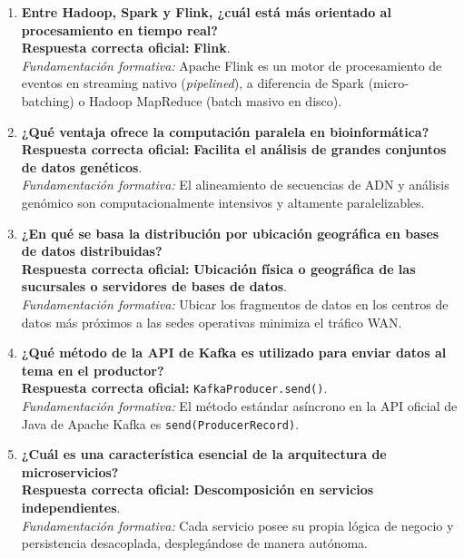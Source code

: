 \documentclass[11pt,a4paper]{article}
\begin{document}
\begin{enumerate}[label=\textbf{Pregunta \arabic*.}]
    \item \textbf{Entre Hadoop, Spark y Flink, ¿cuál está más orientado al procesamiento en tiempo real?}\\
    \textbf{Respuesta correcta oficial:} \textbf{Flink}.\\
    \textit{Fundamentación formativa:} Apache Flink es un motor de procesamiento de eventos en streaming nativo (\textit{pipelined}), a diferencia de Spark (micro-batching) o Hadoop MapReduce (batch masivo en disco).

    \item \textbf{¿Qué ventaja ofrece la computación paralela en bioinformática?}\\
    \textbf{Respuesta correcta oficial:} \textbf{Facilita el análisis de grandes conjuntos de datos genéticos}.\\
    \textit{Fundamentación formativa:} El alineamiento de secuencias de ADN y análisis genómico son computacionalmente intensivos y altamente paralelizables.

    \item \textbf{¿En qué se basa la distribución por ubicación geográfica en bases de datos distribuidas?}\\
    \textbf{Respuesta correcta oficial:} \textbf{Ubicación física o geográfica de las sucursales o servidores de bases de datos}.\\
    \textit{Fundamentación formativa:} Ubicar los fragmentos de datos en los centros de datos más próximos a las sedes operativas minimiza el tráfico WAN.

    \item \textbf{¿Qué método de la API de Kafka es utilizado para enviar datos al tema en el productor?}\\
    \textbf{Respuesta correcta oficial:} \texttt{KafkaProducer.send()}.\\
    \textit{Fundamentación formativa:} El método estándar asíncrono en la API oficial de Java de Apache Kafka es \texttt{send(ProducerRecord)}.

    \item \textbf{¿Cuál es una característica esencial de la arquitectura de microservicios?}\\
    \textbf{Respuesta correcta oficial:} \textbf{Descomposición en servicios independientes}.\\
    \textit{Fundamentación formativa:} Cada servicio posee su propia lógica de negocio y persistencia desacoplada, desplegándose de manera autónoma.


\end{enumerate}
\end{document}
